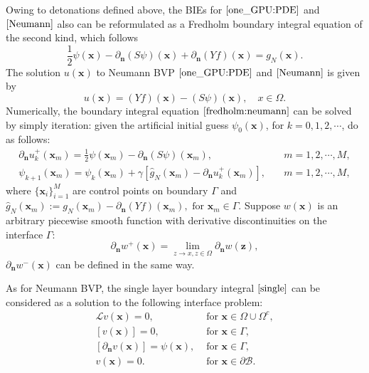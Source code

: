 \documentclass{article}
\begin{document}
Owing to detonations defined above, the BIEs for $\eqref{one_GPU:PDE}$ and $\eqref{Neumann}$ also can be reformulated as a Fredholm boundary integral equation of the second kind\cite{kress1989linear,hsiao2008boundary}, which follows
\begin{equation}
    \frac{1}{2}\psi(\mathbf{x}) -\partial_{\mathbf{n}} (S\psi)(\mathbf{x}) + \partial_{\mathbf{n}} (Yf)(\mathbf{x}) = g_{N}(\mathbf{x}).
    \label{fredholm:neumann}
\end{equation}
The solution $u(\mathbf{x})$ to Neumann BVP $\eqref{one_GPU:PDE}$ and $\eqref{Neumann}$ is given by 
\begin{equation}
    u(\mathbf{x}) = (Yf)(\mathbf{x}) - (S\psi)(\mathbf{x}), \quad x \in \Omega.
\end{equation}
Numerically, the boundary integral equation $\eqref{fredholm:neumann}$ can be solved by simply iteration: given the artificial initial guess $\psi_{0}(\mathbf{x})$, for $k = 0, 1, 2, \cdots$, do as follows:
\begin{align}
    \partial_{\mathbf{n}} u_{k}^{+}(\mathbf{x}_{m}) = \frac{1}{2}\psi(\mathbf{x}_{m}) - \partial_{\mathbf{n}}(S\psi)(\mathbf{x}_{m}), & \quad m = 1, 2, \cdots, M,\label{neumann:richardson1} \\
    \psi_{k+1}(\mathbf{x}_{m}) = \psi_{k}(\mathbf{x}_{m}) + \gamma[\hat{g}_{N}(\mathbf{x}_{m}) - \partial_{\mathbf{n}} u_{k}^{+}(\mathbf{x}_{m})], & \quad m = 1, 2, \cdots, M, \label{neumann:richardson2}
\end{align}
where $\{\mathbf{x}_i\}_{i = 1}^M$ are control points on boundary $\Gamma$ and $\hat{g}_{N}(\mathbf{x}_{m}) := g_{N}(\mathbf{x}_{m})-\partial_{\mathbf{n}}(Yf)(\mathbf{x}_{m}),\text{ for } \mathbf{x}_{m} \in \Gamma$. Suppose $w(\mathbf{x})$ is an arbitrary piecewise smooth function with derivative  discontinuities on the interface $\Gamma$: 
\begin{equation}
    \partial_{\mathbf{n}} w^{+}(\mathbf{x}) = \lim_{z \to x, z \in \Omega} \partial _{\mathbf{n}} w(\mathbf{z}),
\end{equation}
$\partial_{\mathbf{n}} w^{-}(\mathbf{x})$ can be defined in the same way. 

As for Neumann BVP, the single layer boundary integral $\eqref{single}$ can be considered as a solution to the following interface problem:
\begin{equation}
\begin{array}{ll}
\mathcal{L} v(\mathbf{x})=0, &\text { for } \mathbf{x} \in \Omega \cup \Omega^{c},\\
{[v(\mathbf{x})]=0}, & \text { for } \mathbf{x} \in \Gamma,\\
{\left[\partial_{\mathbf{n}} v(\mathbf{x})\right]=\psi(\mathbf{x})}, & \text { for } \mathbf{x} \in \Gamma,\\
v(\mathbf{x})=0. & \text { for } \mathbf{x} \in \partial \mathcal{B}.
\end{array}
\label{single:interface}
\end{equation}
\end{document}
